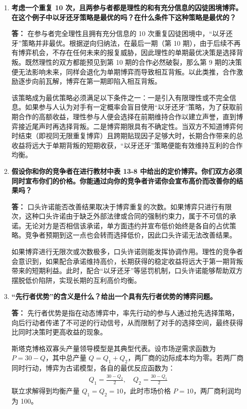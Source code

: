 \begin{enumerate}[label=\textbf{\arabic*.}, leftmargin=*]
		\item \textbf{考虑一个重复 10 次，且两参与者都是理性的和有充分信息的囚徒困境博弈。在这个例子中以牙还牙策略是最优的吗？在什么条件下这种策略是最优的？}
		
		\textbf{答：}
		在参与者完全理性且拥有充分信息的 10 次重复囚徒困境中，“以牙还牙”策略并非最优。根据逆向归纳法，在最后一期（第 10 期），由于后续不再有博弈机会，不存在任何未来的报复威胁，因此理性的单期最优决策是选择背叛。既然理性的双方都能预见到第 10 期的合作必然破裂，那么第 9 期的决策便无法影响未来，同样会退化为单期博弈而导致相互背叛。以此类推，合作激励逐步向前瓦解，博弈在第一期即陷入相互背叛。
		
		该策略成为最优策略必须满足以下条件之一：一是引入有限理性或不完全信息。如果参与人认为对手有一定概率会盲目使用“以牙还牙”策略，为了获取前期合作的高额收益，理性参与人便会选择在前期维持合作以建立声誉，直到博弈接近尾声时再选择背叛。二是博弈期限具有不确定性。当双方不知道博弈何时结束（即视同无限重复博弈）且跨期贴现因子足够大时，长期合作带来的总收益将远大于单期背叛的短期收获，“以牙还牙”策略便能有效维持互利的合作均衡。
		\newpage
		\item \textbf{假设你和你的竞争者在进行教材中表 13-8 中给出的定价博弈。你们双方必须同时宣布你们的价格。你能通过向你的竞争者许诺你会宣布高价而改善你的结果吗？}
		
		\textbf{答：}
		口头许诺能否改善结果取决于博弈重复的次数。如果博弈只进行有限次，这种口头许诺由于缺乏外部法律或合同的强制约束力，属于不可信的承诺。无论对方是否相信该承诺，单方面违约并宣布低价始终是各自的占优策略。竞争者预期到这一点也会转而选择低价，因此口头许诺无法改善结果。
		
		如果博弈进行无限次或次数极多，口头许诺则能发挥协调作用。理性的竞争者会意识到，如果配合承诺维持高价，长期获得的稳定收益将远大于第一期背叛带来的短期利益。此时，配合“以牙还牙”等惩罚机制，口头许诺能够帮助双方摆脱低价陷阱，实现长期的互利高价均衡。
		
		\item \textbf{“先行者优势”的含义是什么？给出一个具有先行者优势的博弈问题。}
		
		\textbf{答：}
		先行者优势是指在动态博弈中，率先行动的参与人通过抢先选择策略，向后行动者传递了不可逆的行动信号，从而限制了对手的选择空间，最终获得比同时决策时更高收益的现象。
		
		斯塔克博格双寡头产量领导模型是其典型代表。设市场逆需求函数为 $P = 30 - Q$，其中总产量 $Q = Q_1 + Q_2$，两厂商的边际成本均为零。若两厂商同时行动，博弈为古诺模型，各自的最优反应函数为：
		\[
		\begin{aligned}
			Q_1 = \frac{30 - Q_2}{2}, \quad Q_2 = \frac{30 - Q_1}{2}
		\end{aligned}
		\]
		联立求解得到均衡产量 $Q_1 = Q_2 = 10$，此时市场价格 $P = 10$，两厂商利润均为 100。
		

\end{enumerate}
